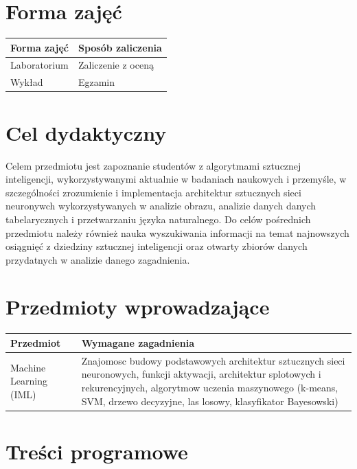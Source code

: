 \documentclass[12pt, a4paper]{article}
\begin{document}
\section{Forma zajęć}

\begin{tabular}{ll}
  \hline
  \textbf{Forma zajęć} & \textbf{Sposób zaliczenia} \\
  \hline
  Laboratorium & Zaliczenie z oceną \\
  Wykład & Egzamin \\
  \hline
\end{tabular}

\section{Cel dydaktyczny}

Celem przedmiotu jest zapoznanie studentów z algorytmami sztucznej inteligencji, wykorzystywanymi aktualnie w badaniach naukowych i przemyśle, w szczególności zrozumienie i implementacja architektur sztucznych sieci neuronywch wykorzystywanych w analizie obrazu, analizie danych danych tabelarycznych i przetwarzaniu języka naturalnego. Do celów pośrednich przedmiotu należy również nauka wyszukiwania informacji na temat najnowszych osiągnięć z dziedziny sztucznej inteligencji oraz otwarty zbiorów danych przydatnych w analizie danego zagadnienia.

\section{Przedmioty wprowadzające}

\begin{tabularx}{\textwidth}{lX}
  \hline
  \textbf{Przedmiot} & \textbf{Wymagane zagadnienia} \\
  \hline
  Machine Learning (IML) & Znajomosc budowy podstawowych architektur sztucznych sieci neuronowych, funkcji aktywacji, architektur splotowych i rekurencyjnych, algorytmow uczenia maszynowego (k-means, SVM, drzewo decyzyjne, las losowy, klasyfikator Bayesowski) \\
  \hline
\end{tabularx}

\section{Treści programowe}
\end{document}
